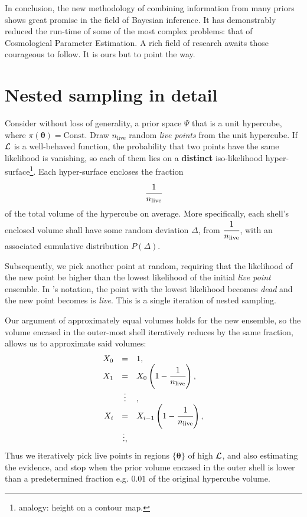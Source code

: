 \documentclass[usenatbib]{mnras}
\begin{document}
In conclusion, the new methodology of combining information from many
priors shows great promise in the field of Bayesian inference. It has
demonstrably reduced the run-time of some of the most complex
problems: that of Cosmological Parameter Estimation. A rich field of
research awaits those courageous to follow. It is ours but to point
the way.




\appendix

\section{Nested sampling in detail}\label{sec:ns}
Consider without loss of generality, a prior space \(\Psi\) that is a
unit hypercube, where \(\pi(\bm{\theta}) = \text{Const.}\) Draw
\(n_\text{live}\) random \emph{live points} from the unit
hypercube. If \({\cal L}\) is a well-behaved function, the probability
that two points have the same likelihood is vanishing, so each of them
lies on a \textbf{distinct} iso-likelihood
hyper-surface\footnote{analogy: height on a contour map. }. Each
hyper-surface encloses the fraction
\begin{equation}
\cfrac{1}{n_\text{live}}
\end{equation}
of the total volume of the hypercube on average. More specifically,
each shell's enclosed volume shall have some random deviation \(\Delta\), from
\(\cfrac{1}{n_\text{live}}\), with an associated cumulative
distribution \(P(\Delta)\).

Subsequently, we pick another point at random, requiring that the
likelihood of the new point be higher than the lowest likelihood of
the initial \emph{live point} ensemble. In \citeauthor{Skilling2006}'s
notation, the point with the lowest likelihood becomes \emph{dead} and
the new point becomes is \emph{live}. This is a single iteration of
nested sampling.

Our argument of approximately equal volumes holds for the new
ensemble, so the volume encased in the outer-most shell iteratively
reduces by the same fraction, allows us to approximate said volumes:
\begin{equation}\label{eq:recurrence-relation}
  \begin{array}{rcl}
  X_{0} &=  &1, \\
  X_{1} &= &X_{0} \left(1- \cfrac{1}{n_\text{live}}\right),\\
  & \vdots &, \\
  X_{i} &= &X_{i-1}\left(1- \cfrac{1}{n_\text{live}}\right),\\
  & \vdots, &
\end{array}
\end{equation}
Thus we iteratively pick live points in regions $\{\bm{\theta}\}$ of
high \({\cal L}\), and also estimating the evidence, and stop when the
prior volume encased in the outer shell is lower than a predetermined
fraction e.g. \(0.01\) of the original hypercube volume.
\end{document}
